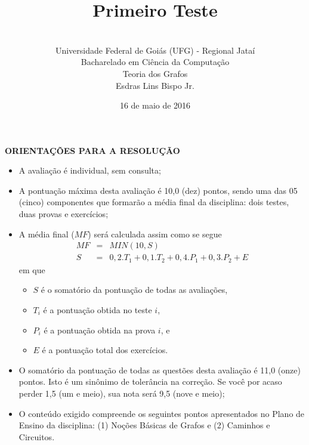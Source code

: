 \documentclass[12pt,a4paper,oneside]{article}
\author{\\Universidade Federal de Goiás (UFG) - Regional Jataí\\Bacharelado em Ciência da Computação \\Teoria dos Grafos \\Esdras Lins Bispo Jr.}
\title{\sc \huge Primeiro Teste}
\date{16 de maio de 2016}
\begin{document}
\maketitle

{\bf ORIENTAÇÕES PARA A RESOLUÇÃO}

\footnotesize

\begin{itemize}
	\item A avaliação é individual, sem consulta;
	\item A pontuação máxima desta avaliação é 10,0 (dez) pontos, sendo uma das 05 (cinco) componentes que formarão a média final da disciplina: dois testes, duas provas e exercícios;
	\item A média final ($MF$) será calculada assim como se segue
	\begin{eqnarray}
		MF & = & MIN(10, S) \nonumber \\
		S & = & 0,2.T_1 + 0,1.T_2 + 0,4.P_1 + 0,3.P_2 + E \nonumber
	\end{eqnarray}
	em que 
	\begin{itemize}
		\item $S$ é o somatório da pontuação de todas as avaliações,
		\item $T_i$ é a pontuação obtida no teste $i$,
		\item $P_i$ é a pontuação obtida na prova $i$, e
		\item $E$ é a pontuação total dos exercícios.
	\end{itemize}
	\item O somatório da pontuação de todas as questões desta avaliação é 11,0 (onze) pontos. Isto é um sinônimo de tolerância na correção. Se você por acaso perder 1,5 (um e meio), sua nota será 9,5 (nove e meio);
	\item O conteúdo exigido compreende os seguintes pontos apresentados no Plano de Ensino da disciplina: (1) Noções Básicas de Grafos e (2) Caminhos e Circuitos.
\end{itemize}

\begin{center}
\end{center}

\newpage

\normalsize
\end{document}

